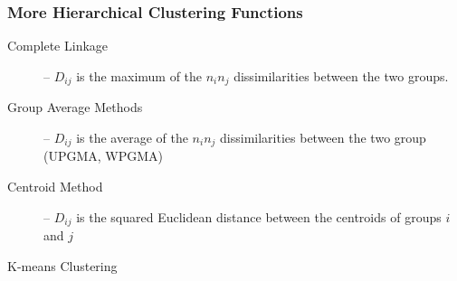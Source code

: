 \documentclass{beamer}
\begin{document}
\begin{frame}
  \frametitle{More Hierarchical Clustering Functions}


\begin{description}

\item[Complete Linkage] -- $D_{ij}$ is the maximum of the $n_i n_j$ dissimilarities between the two groups.

\item[Group Average Methods] -- $D_{ij}$ is the average of the $n_i n_j$  dissimilarities between the two group (UPGMA, WPGMA)

\item[Centroid Method] -- $D_{ij}$ is the squared Euclidean distance between the centroids of groups $i$ and $j$

\end{description}

\end{frame}



\begin{frame}[plain,c]
\begin{center}
\Huge K-means Clustering
\end{center}
\end{frame}

\end{document}
